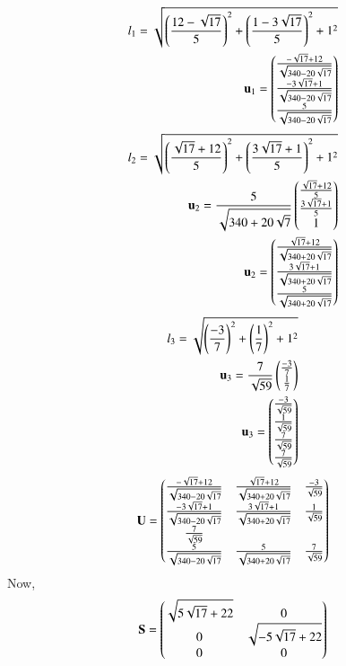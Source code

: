 \documentclass[journal,12pt,twocolumn]{IEEEtran}
\begin{document}
\begin{align}
l_1=\sqrt{{\left(\frac{12-\sqrt{17}}{5}\right)}^2+{\left(\frac{1-3\sqrt{17}}{5}\right)}^2+1^2}\\
\mathbf{u}_1=\begin{pmatrix}\frac{-\sqrt{17}+12}{\sqrt{340-20\sqrt{17}}}\\\frac{-3\sqrt{17}+1}{\sqrt{340-20\sqrt{17}}}\\\frac{5}{\sqrt{340-20\sqrt{17}}}\end{pmatrix}\\
\end{align}
\begin{align}
l_2=\sqrt{\left({\frac{\sqrt{17}+12}{5}}\right)^2+\left({\frac{3\sqrt{17}+1}{5}}\right)^2+1^2}\\
\mathbf{u}_2=\frac{5}{\sqrt{340+20\sqrt{7}}}\begin{pmatrix}\frac{\sqrt{17}+12}{5}\\\frac{3\sqrt{17}+1}{5}\\1\end{pmatrix}\\
\mathbf{u}_2=\begin{pmatrix}\frac{\sqrt{17}+12}{\sqrt{340+20\sqrt{17}}}\\\frac{3\sqrt{17}+1}{\sqrt{340+20\sqrt{17}}}\\\frac{5}{\sqrt{340+20\sqrt{17}}}\end{pmatrix}
\end{align}
\begin{align}
l_3=\sqrt{\left({\frac{-3}{7}}\right)^2+\left({\frac{1}{7}}\right)^2+1^2}\\
\mathbf{u}_3=\frac{7}{\sqrt{59}}\begin{pmatrix}\frac{-3}{7}\\\frac{1}{7}\end{pmatrix}\\
\mathbf{u}_3=\begin{pmatrix}\frac{-3}{\sqrt{59}}\\\frac{1}{\sqrt{59}}\\\frac{7}{\sqrt{59}}\\\frac{7}{\sqrt{59}}\end{pmatrix}
\end{align}
\begin{align}
\mathbf{U}=\begin{pmatrix}\frac{-\sqrt{17}+12}{\sqrt{340-20\sqrt{17}}}&\frac{\sqrt{17}+12}{\sqrt{340+20\sqrt{17}}}&\frac{-3}{\sqrt{59}}\\\frac{-3\sqrt{17}+1}{\sqrt{340-20\sqrt{17}}}&\frac{3\sqrt{17}+1}{\sqrt{340+20\sqrt{17}}}&\frac{1}{\sqrt{59}}\\\frac{7}{\sqrt{59}}\\\frac{5}{\sqrt{340-20\sqrt{17}}}&\frac{5}{\sqrt{340+20\sqrt{17}}}&\frac{7}{\sqrt{59}}\end{pmatrix}
\end{align}
Now,
\begin{align}
\mathbf{S}=\begin{pmatrix}\sqrt{5\sqrt{17}+22}&0\\0&\sqrt{-5\sqrt{17}+22}\\0&0\end{pmatrix}
\end{align}
\end{document}
